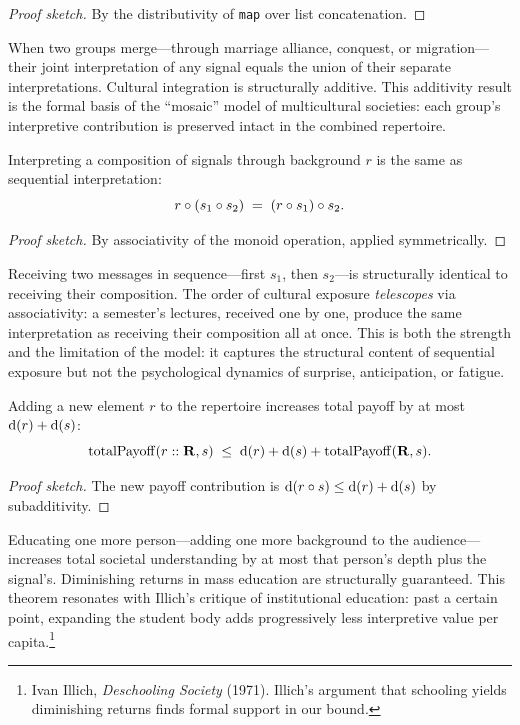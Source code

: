 \begin{proof}[Proof sketch]
By the distributivity of \texttt{map} over list concatenation.
\end{proof}

When two groups merge---through marriage alliance, conquest, or
migration---their joint interpretation of any signal equals the union of their
separate interpretations.  Cultural integration is structurally additive.
This additivity result is the formal basis of the ``mosaic'' model of
multicultural societies: each group's interpretive contribution is preserved
intact in the combined repertoire.

\begin{theorem}
\label{thm:composed-assoc}
Interpreting a composition of signals through background $r$ is the same
as sequential interpretation:
\[
  r \circ (s_1 \circ s_2)
  \;=\;
  (r \circ s_1) \circ s_2.
\]
\end{theorem}

\begin{proof}[Proof sketch]
By associativity of the monoid operation, applied symmetrically.
\end{proof}

Receiving two messages in sequence---first $s_1$, then $s_2$---is
structurally identical to receiving their composition.  The order of cultural
exposure \emph{telescopes} via associativity: a semester's lectures, received
one by one, produce the same interpretation as receiving their composition
all at once.  This is both the strength and the limitation of the model: it
captures the structural content of sequential exposure but not the
psychological dynamics of surprise, anticipation, or fatigue.

\begin{theorem}
\label{thm:marginal-bound}
Adding a new element $r$ to the repertoire increases total payoff by at most
$\operatorname{d}(r) + \operatorname{d}(s)$:
\[
  \operatorname{totalPayoff}(r :: \mathbf{R}, s)
  \;\le\;
  \operatorname{d}(r) + \operatorname{d}(s) + \operatorname{totalPayoff}(\mathbf{R}, s).
\]
\end{theorem}

\begin{proof}[Proof sketch]
The new payoff contribution is $\operatorname{d}(r \circ s) \le \operatorname{d}(r) + \operatorname{d}(s)$
by subadditivity.
\end{proof}

Educating one more person---adding one more background to the audience---increases
total societal understanding by at most that person's depth plus the signal's.
Diminishing returns in mass education are structurally guaranteed.  This
theorem resonates with Illich's critique of institutional education: past a
certain point, expanding the student body adds progressively less interpretive
value per capita.\footnote{Ivan Illich, \textit{Deschooling Society} (1971).
Illich's argument that schooling yields diminishing returns finds formal
support in our bound.}

